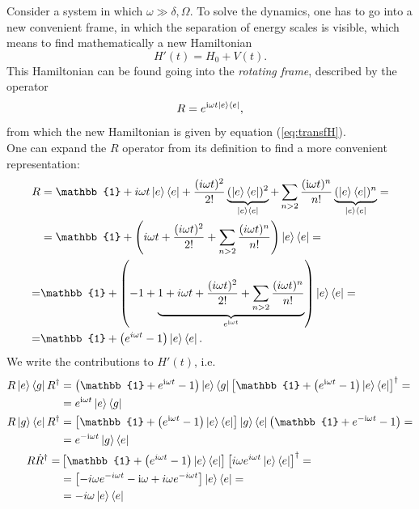 Consider a system in which $\omega \gg \delta, \Omega$. To solve the dynamics, one has to go into a new convenient frame, in which the separation of energy scales is visible, which means to find mathematically a new Hamiltonian $$H'(t)= H_0 + V(t).$$
This Hamiltonian can be found going into the \textit{rotating frame}, described by the operator $$R = e^{\text{i} \omega t \ket{e} \bra{e}},$$ from which the new Hamiltonian is given by equation (\ref{eq:transfH}). \\
One can expand the $R$ operator from its definition to find a more convenient representation:
\begin{align}
    R &=  {\mathbb{1} + {i} \omega t \ket{e} \bra{e} + \frac{({i} \omega t)^2}{2 !} \underbrace{(\ket{e} \bra{e})^2}_{\ket{e} \bra{e}} + \sum_{n>2} \frac{(\text{i} \omega t)^n}{n !} \underbrace{(\ket{e} \bra{e})^n}_{\ket{e} \bra{e}} } = \\
     &= \mathbb{1} + \left( {i} \omega t + \frac{({i} \omega t)^2}{2 !} + \sum_{n>2} \frac{({i} \omega t)^n}{n !} \right) \ket{e} \bra{e} = \\
    = & \mathbb{1} + \left( - 1 + \underbrace{ 1 + {i} \omega t + \frac{({i} \omega t)^2}{2 !} + \sum_{n>2} \frac{({i} \omega t)^n}{n !} }_{e^{\text{i} \omega t}} \right) \ket{e} \bra{e} = \\
    = & \mathbb{1} + \left( e^{{i} \omega t} -1 \right) \ket{e} \bra{e}.
\end{align}
We write the contributions to $H'(t)$, i.e.
\begin{align*}
    R \ket{e} \bra{g} R^{\dagger} &=  \left( \mathbb{1} + e^{\text{i} \omega t} -1\right) \ket{e} \bra{g} \left[ \mathbb{1} + \left( e^{\text{i} \omega t} -1 \right) \ket{e} \bra{e}\right]^{\dagger} = \\
    &= e^{\text{i} \omega t} \ket{e} \bra{g} \\
    R \ket{g} \bra{e} R^{\dagger} &=  \left[ \mathbb{1} + \left( e^{\text{i} \omega t} -1 \right) \ket{e} \bra{e}\right] \ket{g} \bra{e} \left( \mathbb{1} + e^{- \text{i} \omega t} -1\right) = \\
    &=  e^{- \text{i} \omega t} \ket{g} \bra{e} \\
    R\Dot{R}^{\dagger} = & \left[ \mathbb{1} + \left( e^{{i} \omega t} -1 \right) \ket{e} \bra{e}\right] \left[ {i} \omega e^{{i} \omega t} \ket{e} \bra{e}\right]^{\dagger} = \\
    &= \left[ -{i} \omega e^{ - i \omega t} - \text{i} \omega + {i} \omega e^{ - {i} \omega t} \right] \ket{e} \bra{e} = \\
    &= - {i} \omega \ket{e} \bra{e}
\end{align*}
